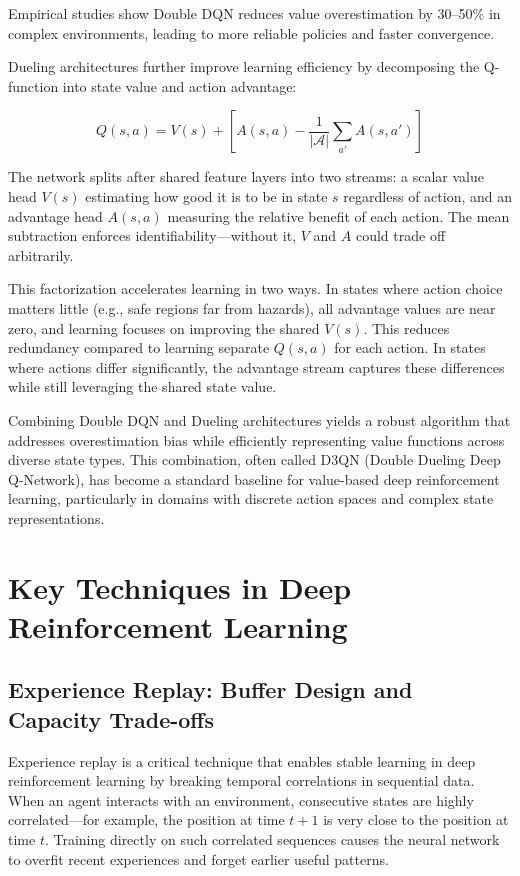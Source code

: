Empirical studies show Double DQN reduces value overestimation by 30--50\% in complex environments, leading to more reliable policies and faster convergence.

Dueling architectures further improve learning efficiency by decomposing the Q-function into state value and action advantage:

\begin{equation}
Q(s,a) = V(s) + [A(s,a) - \frac{1}{|\mathcal{A}|}\sum_{a'} A(s,a')]
\end{equation}

The network splits after shared feature layers into two streams: a scalar value head $V(s)$ estimating how good it is to be in state $s$ regardless of action, and an advantage head $A(s,a)$ measuring the relative benefit of each action. The mean subtraction enforces identifiability---without it, $V$ and $A$ could trade off arbitrarily.

This factorization accelerates learning in two ways. In states where action choice matters little (e.g., safe regions far from hazards), all advantage values are near zero, and learning focuses on improving the shared $V(s)$. This reduces redundancy compared to learning separate $Q(s,a)$ for each action. In states where actions differ significantly, the advantage stream captures these differences while still leveraging the shared state value.

Combining Double DQN and Dueling architectures yields a robust algorithm that addresses overestimation bias while efficiently representing value functions across diverse state types. This combination, often called D3QN (Double Dueling Deep Q-Network), has become a standard baseline for value-based deep reinforcement learning, particularly in domains with discrete action spaces and complex state representations.

\section{Key Techniques in Deep Reinforcement Learning}

\subsection{Experience Replay: Buffer Design and Capacity Trade-offs}

Experience replay is a critical technique that enables stable learning in deep reinforcement learning by breaking temporal correlations in sequential data. When an agent interacts with an environment, consecutive states are highly correlated---for example, the position at time $t+1$ is very close to the position at time $t$. Training directly on such correlated sequences causes the neural network to overfit recent experiences and forget earlier useful patterns.


